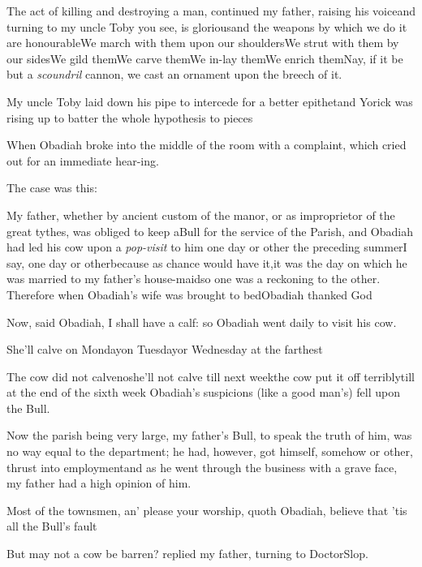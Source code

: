 \documentclass[twoside]{article}
\begin{document}
\tsh The act of killing and destroying a man, continued
my father, raising his voice\tsk and turning to my uncle
Toby\tsk\etp{} you see, is glorious\tsk and the weapons by
which we do it are honourable\tsh We march with them upon
our shoulders\tsk\break We strut with them by our
sides\tsh We gild them\tsh We carve
them\tsh We in-lay them\tsh We enrich
them\tsh\break Nay, if it be but a \textit{scoundril} cannon, we
cast an ornament upon the breech of it.\tsk

\tsh My uncle Toby laid down his pipe to
intercede for a better epithet\tsh\break and Yorick was
rising up to batter the whole hypothesis to
pieces\tsh

\tsh When Obadiah broke into the middle of the
room with a complaint, which cried out for an immediate
hear-\break ing.

The case was this:

My father, whether by ancient custom of the manor, or as
improprietor of the great tythes, was obliged to keep a\break Bull for
the service of the Parish, and Obadiah had led his cow upon
a \textit{pop-visit} to him one day or other the preceding
summer\tsh I say, one day or other\tsk because as chance
would have it,\break it was the day on which he was married to my
father’s house-maid\tsh so one was a reckoning to
the other. Therefore when Obadiah’s wife was brought
to\break
bed\tsk Obadiah thanked God\tsh

\tsh Now, said Obadiah, I shall have a calf: so
Obadiah went daily to visit his cow.

She’ll calve on Monday\tsk on
Tuesday\break\tsk or Wednesday at the
farthest\tsh

The cow did not calve\tsh no\tsk she’ll not calve till next week\tsh the cow put it
off terribly\tsh till at the end of the sixth week Obadiah’s suspicions (like a
good man’s) fell upon the Bull.

Now the parish being very large, my father’s Bull, to
speak the truth of him, was no way equal to the department; he had,
however, got himself, somehow or other, thrust into
employment\tsk and as he went through the business with a grave
face, my father had a high opinion of him.

\tsh Most of the townsmen, an’ please your
worship, quoth Obadiah, believe that ’tis all the
Bull’s fault\tsh

\tsh But may not a cow be barren?\break
replied my father, turning to Doctor\break Slop.
\end{document}
